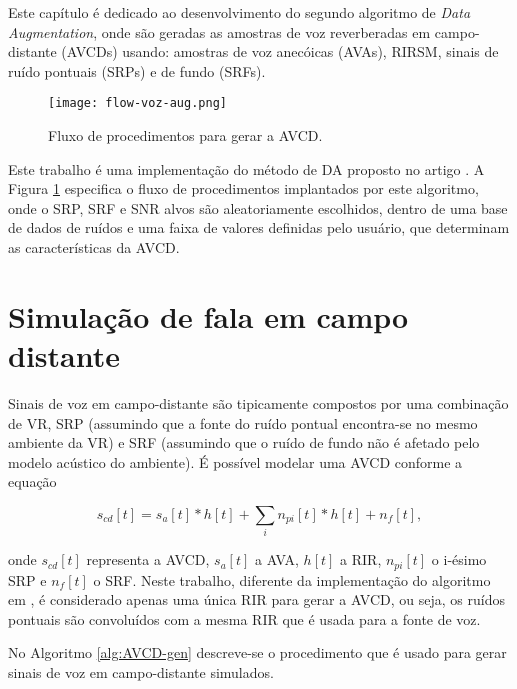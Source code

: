 Este capítulo é dedicado ao desenvolvimento do segundo algoritmo de \textit{Data Augmentation}, onde são geradas as amostras de voz 
reverberadas em campo-distante (AVCDs) usando: amostras de voz anecóicas (AVAs), RIRSM, sinais de ruído pontuais (SRPs) e de fundo (SRFs).

\begin{figure} [H]
    \centering
    \texttt{[image: flow-voz-aug.png]}
    \caption{Fluxo de procedimentos para gerar a AVCD.} 
    \label{fig:flow-voz-rev}
\end{figure}

Este trabalho é uma implementação do método de DA proposto no artigo \cite{Speech_Rec}. A Figura \ref{fig:flow-voz-rev} especifica 
o fluxo de procedimentos implantados por este algoritmo, onde o SRP, SRF e SNR alvos são aleatoriamente escolhidos, 
dentro de uma base de dados de ruídos e uma faixa de valores definidas pelo usuário, que determinam as características da AVCD. 

\section{Simulação de fala em campo distante} 

Sinais de voz em campo-distante são tipicamente compostos por uma combinação de VR, SRP (assumindo que a fonte do ruído pontual encontra-se 
no mesmo ambiente da VR) e SRF (assumindo que o ruído de fundo não é afetado pelo modelo acústico do ambiente).
É possível modelar uma AVCD conforme a equação

\begin{equation} \label{eqn:AVCD-model}
    s_{cd}[t] = s_a[t] \ast h[t] + \sum_i n_{pi}[t] \ast h[t] + n_f[t]
    ,
\end{equation}

\noindent
onde $s_{cd}[t]$ representa a AVCD, $s_a[t]$ a AVA, $h[t]$ a RIR, $n_{pi}[t]$ o i-ésimo SRP e $n_f[t]$ o SRF.
Neste trabalho, diferente da implementação do algoritmo em \cite{Speech_Rec}, é considerado apenas uma única RIR
para gerar a AVCD, ou seja, os ruídos pontuais são convoluídos com a mesma RIR que é usada para a fonte de voz.

No Algoritmo \ref{alg:AVCD-gen} descreve-se o procedimento que é usado para gerar sinais de voz em campo-distante simulados. 
\bigbreak
\bigbreak

